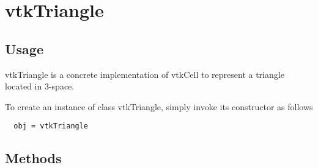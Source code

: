 \section{vtkTriangle}

\subsection{Usage}

 vtkTriangle is a concrete implementation of vtkCell to represent a triangle
 located in 3-space.

To create an instance of class vtkTriangle, simply
invoke its constructor as follows
\begin{verbatim}
  obj = vtkTriangle
\end{verbatim}
\subsection{Methods}

